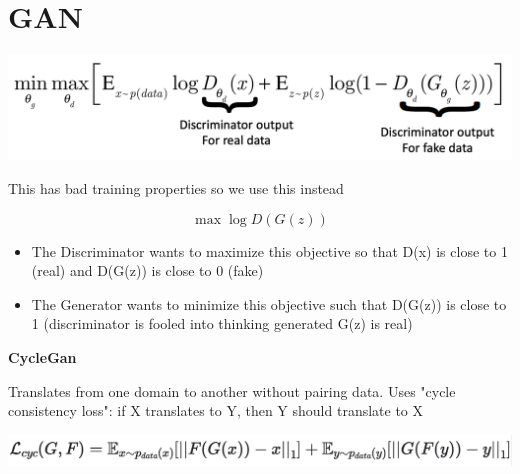 \section{GAN}

\includegraphics[width=0.9\columnwidth]{images/gan}

This has bad training properties so we use this instead

$$
\max \log D(G(z))
$$

\begin{itemize}
  \item The Discriminator wants to maximize this objective so that D(x) is close to 1 (real) and D(G(z)) is close to 0 (fake)
\item The Generator wants to minimize this objective such that D(G(z)) is close to 1 (discriminator is fooled into thinking generated G(z) is real)
\end{itemize}


\textbf{CycleGan}

Translates from one domain to another without pairing data.
Uses "cycle consistency loss": if X translates to Y, then Y should translate to X

\includegraphics[width=0.9\columnwidth]{images/cyclegan_loss}

